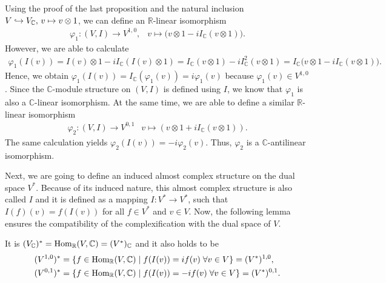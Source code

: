 \begin{rem}
	\label{loc-theory:rem:c-linear-c-antilinear}
	Using the proof of the last proposition and the natural inclusion \linebreak$V \hookrightarrow V_\mathbb{C},\,
	v \mapsto v \otimes 1$, we can define an $\mathbb{R}$-linear isomorphism 
	\begin{align*}
		\varphi_1: (V,I) \rightarrow V^{1,0},\;\enspace v \mapsto \big(v\otimes 1-iI_\mathbb{C}(v\otimes 1)\big).
	\end{align*}
	However, we are able to calculate
	\begin{align*}
		\varphi_1(I(v)) = I(v) \otimes 1 - iI_\mathbb{C}(I(v) \otimes 1) = I_\mathbb{C}(v \otimes 1)
		-iI_\mathbb{C}^2(v \otimes 1) = I_\mathbb{C}\big(v\otimes 1 -iI_\mathbb{C}(v\otimes 1)\big).
	\end{align*}
	Hence, we obtain $\varphi_1(I(v)) = I_\mathbb{C}(\varphi_1(v)) = i\varphi_1(v)$ because
	$\varphi_1(v) \in V^{1,0}$. Since the $\mathbb{C}$-module structure on $(V,I)$ is defined using $I$,
	we know that $\varphi_1$ is also a $\mathbb{C}$-linear isomorphism. At the same time, we are able to
	define a similar $\mathbb{R}$-linear isomorphism 
	\begin{align*}
		\varphi_2: (V,I) \rightarrow V^{0,1} \;\enspace
		v \mapsto (v \otimes 1 + iI_\mathbb{C}(v \otimes 1)).
	\end{align*}
	The same calculation yields $\varphi_2(I(v)) = -i\varphi_2(v)$. Thus, $\varphi_2$ is a
	$\mathbb{C}$-antilinear isomorphism.
\end{rem}
Next, we are going to define an induced almost complex structure on the dual space $V^*$. Because of
its induced nature, this almost complex structure is also called $I$ and it is defined as a mapping 
$I: V^* \rightarrow V^*$, such that $I(f)(v) = f(I(v))$ for all $f \in V^*$ and $v \in V$.
Now, the following lemma ensures the compatibility of the complexification with the dual space of $V$.
\begin{lm}
	\label{loc-theory:lm:compatibility-of-dual-and-complexification}
	It is $(V_\mathbb{C})^* = \operatorname{Hom}_\mathbb{R}(V,\mathbb{C}) = (V^*)_\mathbb{C}$ and it also holds to be
	\begin{alignat*}{2}
		(V^{1,0})^* &= \left\{f \in \operatorname{Hom}_\mathbb{R}(V,\mathbb{C}) \mid f(I(v)) = if(v)\; \forall v \in V\right\} = (V^*)^{1,0},\\
		(V^{0,1})^* &= \left\{f \in \operatorname{Hom}_\mathbb{R}(V,\mathbb{C}) \mid f(I(v)) = -if(v)\;  \forall v \in V\right\} = (V^*)^{0,1}.
	\end{alignat*}
\end{lm}
